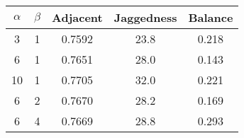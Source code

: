 \begin{tabular}{|c|c|c|c|c|}
\hline
$\alpha$ & $\beta$ & Adjacent & Jaggedness & Balance \\
\hline
3 & 1 & 0.7592 & 23.8 & 0.218 \\
6 & 1 & 0.7651 & 28.0 & 0.143 \\
10 & 1 & 0.7705 & 32.0 & 0.221 \\
6 & 2 & 0.7670 & 28.2 & 0.169 \\
6 & 4 & 0.7669 & 28.8 & 0.293 \\
\hline
\end{tabular}
